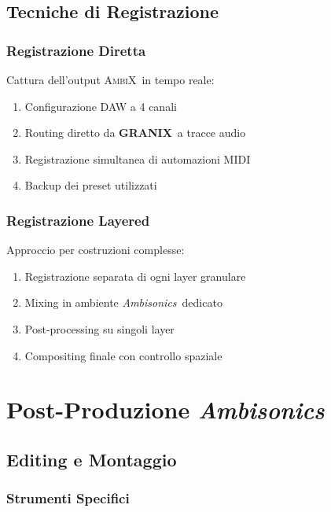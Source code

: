 \documentclass[a4paper,11pt,openany]{book}
\newcommand{\granix}{\textbf{\textcolor{granixblue}{GRANIX}}}
\newcommand{\ambisonics}{\textit{Ambisonics}}
\newcommand{\ambix}{\textsc{AmbiX}}
\begin{document}
\subsection{Tecniche di Registrazione}

\subsubsection{Registrazione Diretta}

Cattura dell'output \ambix\ in tempo reale:

\begin{enumerate}
    \item Configurazione DAW a 4 canali
    \item Routing diretto da \granix\ a tracce audio
    \item Registrazione simultanea di automazioni MIDI
    \item Backup dei preset utilizzati
\end{enumerate}

\subsubsection{Registrazione Layered}

Approccio per costruzioni complesse:

\begin{enumerate}
    \item Registrazione separata di ogni layer granulare
    \item Mixing in ambiente \ambisonics\ dedicato
    \item Post-processing su singoli layer
    \item Compositing finale con controllo spaziale
\end{enumerate}

\section{Post-Produzione \ambisonics}

\subsection{Editing e Montaggio}

\subsubsection{Strumenti Specifici}
\end{document}
